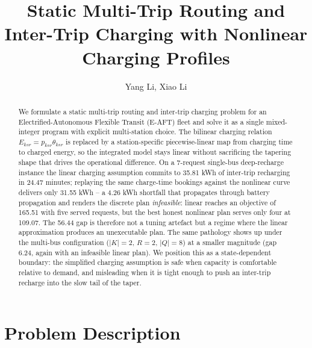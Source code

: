 \documentclass[11pt]{article}
\date{}
\title{Static Multi-Trip Routing and Inter-Trip Charging with Nonlinear Charging Profiles}
\author{Yang Li, Xiao Li}
\begin{document}
\maketitle

\begin{abstract}
\noindent
We formulate a static multi-trip routing and inter-trip charging problem for an Electrified-Autonomous Flexible Transit (E-AFT) fleet and solve it as a single mixed-integer program with explicit multi-station choice. The bilinear charging relation \(E_{ksr}=p_{ksr}\theta_{ksr}\) is replaced by a station-specific piecewise-linear map from charging time to charged energy, so the integrated model stays linear without sacrificing the tapering shape that drives the operational difference. On a 7-request single-bus deep-recharge instance the linear charging assumption commits to 35.81 kWh of inter-trip recharging in 24.47 minutes; replaying the same charge-time bookings against the nonlinear curve delivers only 31.55 kWh -- a 4.26 kWh shortfall that propagates through battery propagation and renders the discrete plan \emph{infeasible}: linear reaches an objective of 165.51 with five served requests, but the best honest nonlinear plan serves only four at 109.07. The 56.44 gap is therefore not a tuning artefact but a regime where the linear approximation produces an unexecutable plan. The same pathology shows up under the multi-bus configuration (\(|K|=2,\,R=2,\,|Q|=8\)) at a smaller magnitude (gap 6.24, again with an infeasible linear plan). We position this as a state-dependent boundary: the simplified charging assumption is safe when capacity is comfortable relative to demand, and misleading when it is tight enough to push an inter-trip recharge into the slow tail of the taper.
\end{abstract}

\section{Problem Description}
\end{document}
